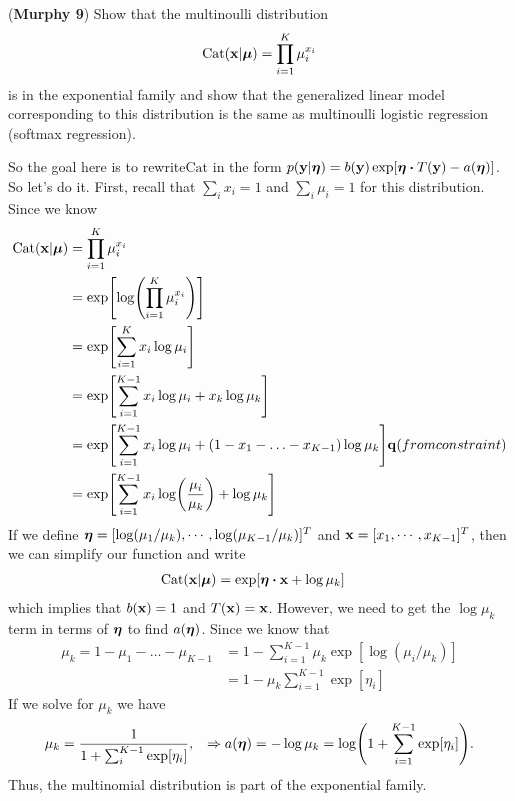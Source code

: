 \documentclass[12pt,letterpaper]{hmcpset}
\begin{document}
\begin{problem}[2]
(\textbf{Murphy 9}) Show that the multinoulli distribution
\[
    \text{Cat}({\bf x}|\hbox{\boldmath$\mu$}) = \prod_{i=1}^K \mu_i^{x_i}
\]
is in the exponential family and show that the generalized linear model
corresponding to this distribution is the same as multinoulli logistic
regression (softmax regression).
\end{problem}
\begin{solution}
So the goal here is to rewrite$\text{Cat}$ in the form $p(\vb y|\etab) = b(\vb y) \exp[\etab \vdot T(\vb y) - a(\etab)]$. So let's do it. First, recall that $\sum_i x_i = 1$ and $\sum_i \mu_i = 1$ for this distribution. Since we know
\begin{align*}
    \text{Cat}({\bf x}|\hbox{\boldmath$\mu$}) &= \prod_{i=1}^K \mu_i^{x_i} \\
    &= \exp[\log(\prod_{i=1}^K \mu_i^{x_i})] \\
    &= \exp[\sum_{i=1}^K x_i \log\mu_i] \\
    &= \exp[\sum_{i=1}^{K-1} x_i \log\mu_i + x_k \log\mu_k] \\
    &= \exp[\sum_{i=1}^{K-1} x_i \log\mu_i + (1 - x_1 - \ldots - x_{K-1}) \log\mu_k] {\bf q}{(from constraint)} \\
    &= \exp[\sum_{i=1}^{K-1} x_i \log(\frac{\mu_i}{\mu_k}) + \log\mu_k] 
\end{align*}
If we define $\hbox{\boldmath$\eta$} = [\log(\mu_1/\mu_k), \cdots,\log(\mu_{K-1}/\mu_k)]^T $ and $\vb x = [x_1, \cdots, x_{K-1}]^T$, then we can simplify our function and write
\begin{align*}
    \text{Cat}(\xx|\mub) &= \exp[\etab \vdot \vb x + \log\mu_k]
\end{align*}
which implies that $b(\vb x) =1$ and $T(\vb x) = \vb x$. However, we need to get the $\log\mu_k$ term in terms of $\hbox{\boldmath$\eta$}$ to find $a(\hbox{\boldmath$\eta$})$.
Since we know that 
\begin{align*}
    \mu_k = 1 - \mu_1 - \ldots - \mu_{K-1} &= 1 - \sum_{i = 1}^{K-1} \mu_k \exp[\log(\mu_i/\mu_k)] \\
    &= 1 - \mu_k \sum_{i = 1}^{K-1} \exp[\eta_i]
\end{align*}
If we solve for $\mu_k$ we have 
\begin{align*}
    &\mu_k = \frac{1}{1 + \sum_{i}^{K -1}\exp[\eta_i]}, 
    &\Rightarrow
    a(\hbox{\boldmath$\eta$}) = - \log\mu_k = \log(1 + \sum_{i = 1}^{K-1} \exp[\eta_i]).
\end{align*}
Thus, the multinomial distribution is part of the exponential family.
\vfill
\end{solution}
\newpage
\end{document}
